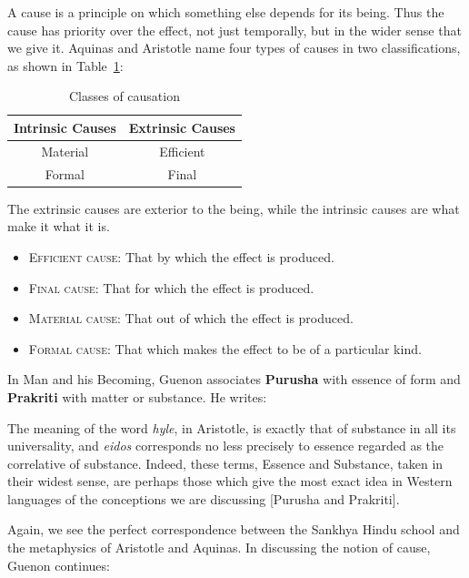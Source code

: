 A cause is a principle on which something else depends for its being. Thus the cause has priority over the effect, not just temporally, but in the wider sense that we give it. Aquinas and Aristotle name four types of causes in two classifications, as shown in Table~\ref{tab:causation}:

\begin{table}[ht]
\centering
\begin{tabular}{cc}
\toprule
Intrinsic Causes &
Extrinsic Causes\\\midrule
Material &
Efficient\\\midrule
Formal &
Final\\\bottomrule
\end{tabular}
\label{tab:causation}
\caption{Classes of causation}
\end{table}

The extrinsic causes are exterior to the being, while the intrinsic causes are what make it what it is.

\begin{itemize}
\item\textsc{Efficient cause:} That by which the effect is produced. 

\item\textsc{Final cause:} That for which the effect is produced. 

\item\textsc{Material cause:} That out of which the effect is produced. 

\item\textsc{Formal cause:} That which makes the effect to be of a particular kind. 

\end{itemize}


In Man and his Becoming, Guenon associates \textbf{Purusha} with essence of form and \textbf{Prakriti} with matter or substance. He writes:

\begin{quotex}
The meaning of the word \emph{hyle}, in Aristotle, is exactly that of substance in all its universality, and \emph{eidos} corresponds no less precisely to essence regarded as the correlative of substance. Indeed, these terms, Essence and Substance, taken in their widest sense, are perhaps those which give the most exact idea in Western languages of the conceptions we are discussing [Purusha and Prakriti]. 

\end{quotex}
Again, we see the perfect correspondence between the Sankhya Hindu school and the metaphysics of Aristotle and Aquinas. In discussing the notion of cause, Guenon continues:

